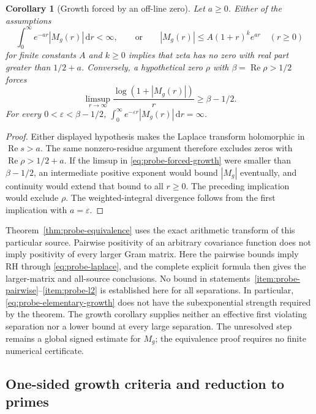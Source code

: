 \documentclass[11pt]{article}
\numberwithin{equation}{section}
\newtheorem{corollary}[theorem]{Corollary}
\theoremstyle{definition}
\theoremstyle{remark}
\newcommand{\Rea}{\operatorname{Re}}
\newcommand{\dd}{\,\mathrm d}
\begin{document}
\begin{corollary}[Growth forced by an off-line zero]
\label{cor:probe-growth}
Let \(a\ge0\). Either of the assumptions
\[
\int_0^\infty e^{-ar}|M_g(r)|\dd r<\infty,
\qquad\text{or}\qquad
|M_g(r)|\le A(1+r)^k e^{ar}\quad(r\ge0)
\]
for finite constants \(A\) and \(k\ge0\) implies that zeta has no
zero with real part greater than \(1/2+a\).
Conversely, a hypothetical zero \(\rho\) with
\(\beta=\Rea\rho>1/2\) forces
\begin{equation}\label{eq:probe-forced-growth}
\limsup_{r\to\infty}\frac{\log(1+|M_g(r)|)}{r}
\ge\beta-1/2.
\end{equation}
For every \(0<\varepsilon<\beta-1/2\),
\(\int_0^\infty e^{-\varepsilon r}|M_g(r)|\dd r=\infty\).
\end{corollary}
\begin{proof}
Either displayed hypothesis makes the Laplace transform holomorphic
in \(\Rea s>a\). The same nonzero-residue argument therefore
excludes zeros with \(\Rea\rho>1/2+a\).
If the limsup in \eqref{eq:probe-forced-growth} were smaller than
\(\beta-1/2\), an intermediate positive exponent would bound
\(|M_g|\) eventually, and continuity would extend that bound to
all \(r\ge0\). The preceding implication would exclude \(\rho\).
The weighted-integral divergence follows from the first implication
with \(a=\varepsilon\).
\end{proof}

Theorem~\ref{thm:probe-equivalence} uses the exact arithmetic transform
of this particular source. Pairwise positivity of an arbitrary
covariance function does not imply positivity of every larger Gram
matrix. Here the pairwise bounds imply RH through
\eqref{eq:probe-laplace}, and the complete explicit formula then gives
the larger-matrix and all-source conclusions.
No bound in statements~\ref{item:probe-pairwise}--\ref{item:probe-l2}
is established here for all separations. In particular,
\eqref{eq:probe-elementary-growth} does not have the subexponential
strength required by the theorem. The growth corollary supplies
neither an effective first violating separation nor a lower bound
at every large separation. The unresolved step remains a global
signed estimate for \(M_g\); the equivalence proof requires no
finite numerical certificate.


\subsection{One-sided growth criteria and reduction to primes}
\label{subsec:probe-one-sided}
\end{document}
